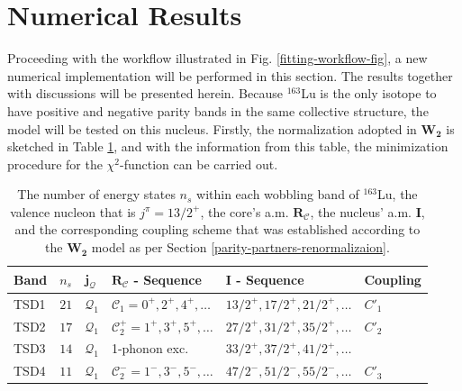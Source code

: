 \section{Numerical Results}
\label{aw2-numerical-results}

Proceeding with the workflow illustrated in Fig. \ref{fitting-workflow-fig}, a new numerical implementation will be performed in this section. The results together with discussions will be presented herein. Because $^{163}$Lu is the only isotope to have positive and negative parity bands in the same collective structure, the model will be tested on this nucleus. Firstly, the normalization adopted in $\mathbf{W_2}$ is sketched in Table \ref{lu163-table-info}, and with the information from this table, the minimization procedure for the $\chi^2$-function can be carried out.
\begin{table}
    \centering
      \begin{tabular}{llllll}
      \hline
      Band & $n_s$ & $\mathbf{j}_\mathcal{Q}$ & $\mathbf{R}_\mathscr{C}$ - Sequence & $\mathbf{I}$ - Sequence & Coupling  \\
      \hline
      \hline
        TSD1 & $21$ & $\mathcal{Q}_1$ & $\mathscr{C}_1=0^+,2^+,4^+,\dots$   & $13/2^+,17/2^+,21/2^+,\dots$ & $C'_1$        \\
        TSD2 & $17$ & $\mathcal{Q}_1$ & $\mathscr{C}_2^+=1^+,3^+,5^+,\dots$ & $27/2^+,31/2^+,35/2^+,\dots$ & $C'_2$        \\
        TSD3 & $14$ & $\mathcal{Q}_1$ & 1-phonon exc.                       & $33/2^+,37/2^+,41/2^+,\dots$ & \\
        TSD4 & $11$ & $\mathcal{Q}_1$ & $\mathscr{C}_2^-=1^-,3^-,5^-,\dots$ & $47/2^-,51/2^-,55/2^-,\dots$ & $C'_3$        \\
      \hline
    \end{tabular}
    \caption{The number of energy states $n_s$ within each wobbling band of $^{163}$Lu, the valence nucleon that is $j^\pi=13/2^+$, the core's a.m. $\mathbf{R}_\mathscr{C}$, the nucleus' a.m. $\mathbf{I}$, and the corresponding coupling scheme that was established according to the $\mathbf{W_2}$ model as per Section \ref{parity-partners-renormalizaion}.}
    \label{lu163-table-info}
\end{table}

